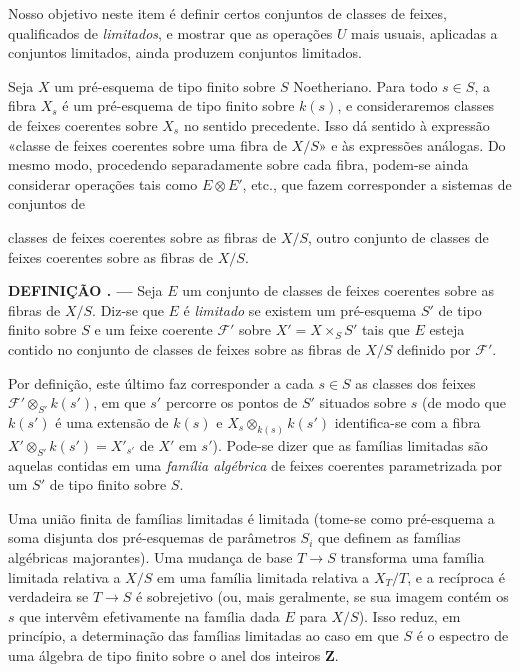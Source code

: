 \documentclass[11pt,twoside,openany]{book}
\numberwithin{equation}{section}
\newcommand{\src}[1]{%
  \phantomsection\hypertarget{src:#1}{}%
  \marginpar{\raggedleft\footnotesize\sffamily #1}%
}
\theoremstyle{plain}
\theoremstyle{definition}
\theoremstyle{remark}
\newcommand{\result}[2]{%
  \par\medskip\noindent\textbf{#1%
  \if\relax\detokenize{#2}\relax\else\space#2\fi. ---}\enspace
}
\newcommand{\FgaUnitKey}{frontmatter}
\renewcommand{\src}[1]{%
  \phantomsection\hypertarget{src:\FgaUnitKey:#1}{}%
  \marginpar{\raggedleft\footnotesize\sffamily #1}%
}
\begin{document}
Nosso objetivo neste item é definir certos conjuntos de classes de feixes,
qualificados de \emph{limitados}, e mostrar que as operações $U$ mais usuais,
aplicadas a conjuntos limitados, ainda produzem conjuntos limitados.

Seja $X$ um pré-esquema de tipo finito sobre $S$ Noetheriano. Para todo
$s\in S$, a fibra $X_s$ é um pré-esquema de tipo finito sobre $k(s)$, e
consideraremos classes de feixes coerentes sobre $X_s$ no sentido precedente.
Isso dá sentido à expressão «classe de feixes coerentes sobre uma fibra de
$X/S$» e às expressões análogas. Do mesmo modo, procedendo separadamente sobre
cada fibra, podem-se ainda considerar operações tais como $E\otimes E'$, etc.,
que fazem corresponder a sistemas de conjuntos de
\src{251}
classes de feixes coerentes sobre as fibras de $X/S$, outro conjunto de classes
de feixes coerentes sobre as fibras de $X/S$.

\result{DEFINIÇÃO}{1.1} Seja $E$ um conjunto de classes de feixes coerentes
sobre as fibras de $X/S$. Diz-se que $E$ é \emph{limitado} se existem um
pré-esquema $S'$ de tipo finito sobre $S$ e um feixe coerente $\mathcal F'$ sobre
$X'=X\times_S S'$ tais que $E$ esteja contido no conjunto de classes de feixes
sobre as fibras de $X/S$ definido por $\mathcal F'$.

Por definição, este último faz corresponder a cada $s\in S$ as classes dos
feixes $\mathcal F'\otimes_{S'}k(s')$, em que $s'$ percorre os pontos de $S'$
situados sobre $s$ (de modo que $k(s')$ é uma extensão de $k(s)$ e
$X_s\otimes_{k(s)}k(s')$ identifica-se com a fibra
$X'\otimes_{S'}k(s')=X'_{s'}$ de $X'$ em $s'$). Pode-se dizer que as famílias
limitadas são aquelas contidas em uma \emph{família algébrica} de feixes
coerentes parametrizada por um $S'$ de tipo finito sobre $S$.

Uma união finita de famílias limitadas é limitada (tome-se como pré-esquema a
soma disjunta dos pré-esquemas de parâmetros $S_i$ que definem as famílias
algébricas majorantes). Uma mudança de base $T\longrightarrow S$ transforma uma
família limitada relativa a $X/S$ em uma família limitada relativa a $X_T/T$, e
a recíproca é verdadeira se $T\longrightarrow S$ é sobrejetivo (ou, mais
geralmente, se sua imagem contém os $s$ que intervêm efetivamente na família
dada $E$ para $X/S$). Isso reduz, em princípio, a determinação das famílias
limitadas ao caso em que $S$ é o espectro de uma álgebra de tipo finito sobre o
anel dos inteiros $\mathbf Z$.
\end{document}
